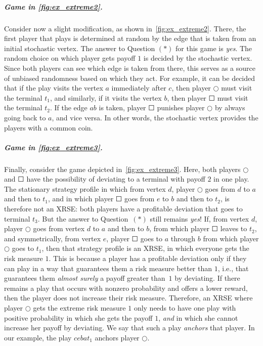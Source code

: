 \subparagraph*{Game in \cref{fig:ex_extreme2}.} Consider now a slight modification, as shown in~\cref{fig:ex_extreme2}.
There, the first player that plays is determined at random by the edge that is taken from an initial stochastic vertex.
The answer to Question $(*)$ for this game is \emph{yes}. 
The random choice on which player gets payoff $1$ is decided by the stochastic vertex. Since both players can see which edge is taken from there, this serves as a source of unbiased randomness based on which they act. %
For example, it can be decided that if the play visits the vertex $a$ immediately after $c$, then player $\Circle$ must visit the terminal $t_1$, and similarly, if it visits the vertex $b$, then player $\Square$ must visit the terminal $t_2$. If the edge $ab$ is taken, player $\Square$ punishes player $\Circle$ by always going back to $a$, and vice versa.
In other words, the stochastic vertex provides the players with a common coin.

\subparagraph*{Game in \cref{fig:ex_extreme3}.} Finally, consider the game depicted in~\cref{fig:ex_extreme3}.
Here, both players $\Circle$ and $\Square$ have the possibility of deviating to a terminal with payoff $2$ in one play.
The stationary strategy profile in which from vertex $d$, player $\Circle$ goes from $d$ to $a$ and then to $t_1$, and in which player $\Square$ goes from $e$ to $b$ and then to $t_2$, is therefore not an XRSE: both players have a profitable deviation that goes to terminal $t_3$.
But the answer to Question~$(*)$ still remains \emph{yes}!
If, from vertex $d$, player $\Circle$ goes from vertex $d$ to $a$ and then to $b$, from which player $\Square$ leaves to $t_2$, and symmetrically, from vertex $e$, player $\Square$ goes to $a$ through $b$ from which player $\Circle$ goes to $t_1$, then that strategy profile is an XRSE, in which everyone gets the risk measure $1$. 
This is because a player has a profitable deviation only if they can play in a way that guarantees them a risk measure better than $1$, i.e., that guarantees them \emph{almost surely} a payoff greater than~$1$ by deviating.
If there remains a play that occurs with nonzero probability and offers a lower reward, then the player does not increase their risk measure.  
Therefore, an XRSE where player $\Circle$ gets the extreme risk measure $1$ only needs to have one play with positive probability in which she gets the payoff $1$, \emph{and} in which she cannot increase her payoff by deviating. We say that such a play \emph{anchors} that player. In our example, the play $cebat_1$ anchors player $\Circle$. 

